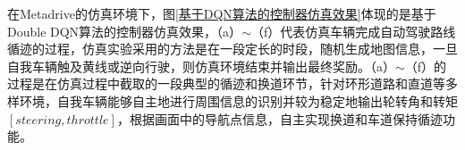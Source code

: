 在Metadrive的仿真环境下，图\ref{基于DQN算法的控制器仿真效果}体现的是基于Double DQN算法的控制器仿真效果，（a）$\sim$（f）代表仿真车辆完成自动驾驶路线循迹的过程，仿真实验采用的方法是在一段定长的时段，随机生成地图信息，一旦自我车辆触及黄线或逆向行驶，则仿真环境结束并输出最终奖励。（a）$\sim$（f）的过程是在仿真过程中截取的一段典型的循迹和换道环节，针对环形道路和直道等多样环境，自我车辆能够自主地进行周围信息的识别并较为稳定地输出轮转角和转矩$[steering, throttle]$，根据画面中的导航点信息，自主实现换道和车道保持循迹功能。

\begin{figure}[htbp]
    \vspace{13pt}
    \centering
\end{figure}
